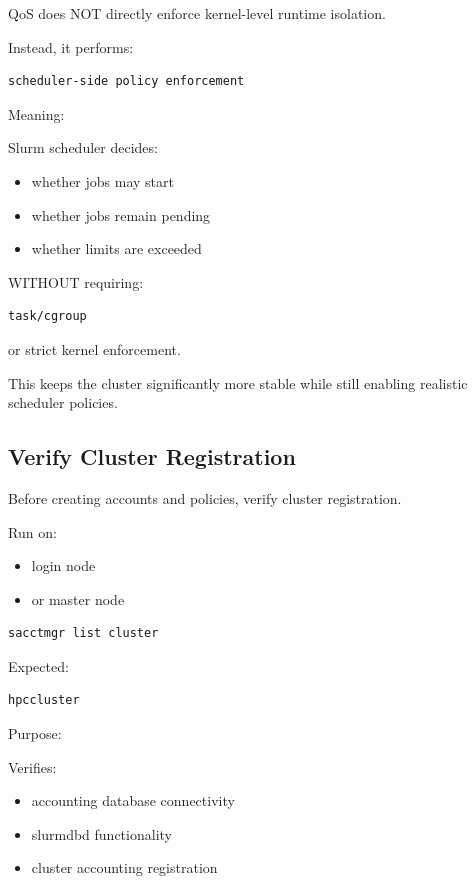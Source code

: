 \documentclass[11pt]{article}
\begin{document}
QoS does NOT directly enforce kernel-level runtime isolation.

Instead, it performs:

\begin{verbatim}
scheduler-side policy enforcement
\end{verbatim}

Meaning:

Slurm scheduler decides:

\begin{itemize}
\item whether jobs may start
\item whether jobs remain pending
\item whether limits are exceeded
\end{itemize}

WITHOUT requiring:

\begin{verbatim}
task/cgroup
\end{verbatim}

or strict kernel enforcement.

This keeps the cluster significantly more stable while still enabling
realistic scheduler policies.
\subsection{Verify Cluster Registration}
\label{sec:org0fb6d2e}

Before creating accounts and policies, verify cluster registration.

Run on:

\begin{itemize}
\item login node
\item or master node
\end{itemize}

\begin{verbatim}
sacctmgr list cluster
\end{verbatim}

Expected:

\begin{verbatim}
hpccluster
\end{verbatim}

Purpose:

Verifies:

\begin{itemize}
\item accounting database connectivity
\item slurmdbd functionality
\item cluster accounting registration
\end{itemize}
\end{document}
